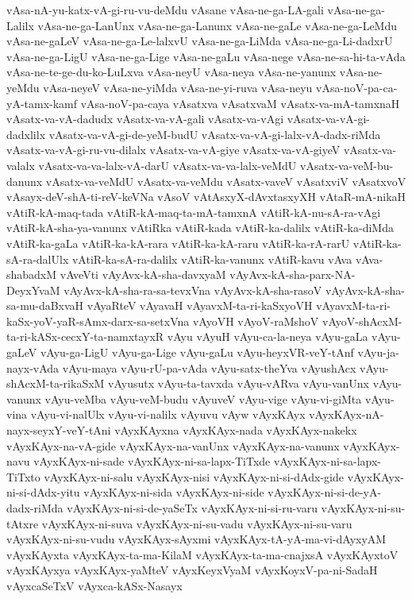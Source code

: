{vAsa-nA-yu-katx-vA-gi-ru-vu-deMdu
vAsane
vAsa-ne-ga-LA-gali
vAsa-ne-ga-Lalilx
vAsa-ne-ga-LanUnx
vAsa-ne-ga-Lanunx
vAsa-ne-gaLe
vAsa-ne-ga-LeMdu
vAsa-ne-gaLeV
vAsa-ne-ga-Le-lalxvU
vAsa-ne-ga-LiMda
vAsa-ne-ga-Li-dadxrU
vAsa-ne-ga-LigU
vAsa-ne-ga-Lige
vAsa-ne-gaLu
vAsa-nege
vAsa-ne-sa-hi-ta-vAda
vAsa-ne-te-ge-du-ko-LuLxva
vAsa-neyU
vAsa-neya
vAsa-ne-yanunx
vAsa-ne-yeMdu
vAsa-neyeV
vAsa-ne-yiMda
vAsa-ne-yi-ruva
vAsa-neyu
vAsa-noV-pa-ca-yA-tamx-kamf
vAsa-noV-pa-caya
vAsatxva
vAsatxvaM
vAsatx-va-mA-tamxnaH
vAsatx-va-vA-dadudx
vAsatx-va-vA-gali
vAsatx-va-vAgi
vAsatx-va-vA-gi-dadxlilx
vAsatx-va-vA-gi-de-yeM-budU
vAsatx-va-vA-gi-lalx-vA-dadx-riMda
vAsatx-va-vA-gi-ru-vu-dilalx
vAsatx-va-vA-giye
vAsatx-va-vA-giyeV
vAsatx-va-valalx
vAsatx-va-va-lalx-vA-darU
vAsatx-va-va-lalx-veMdU
vAsatx-va-veM-bu-danunx
vAsatx-va-veMdU
vAsatx-va-veMdu
vAsatx-vaveV
vAsatxviV
vAsatxvoV
vAsayx-deV-shA-ti-reV-keVNa
vAsoV
vAtAsxyX-dAvxtasxyXH
vAtaR-mA-nikaH
vAtiR-kA-maq-tada
vAtiR-kA-maq-ta-mA-tamxnA
vAtiR-kA-nu-sA-ra-vAgi
vAtiR-kA-sha-ya-vanunx
vAtiRka
vAtiR-kada
vAtiR-ka-dalilx
vAtiR-ka-diMda
vAtiR-ka-gaLa
vAtiR-ka-kA-rara
vAtiR-ka-kA-raru
vAtiR-ka-rA-rarU
vAtiR-ka-sA-ra-dalUlx
vAtiR-ka-sA-ra-dalilx
vAtiR-ka-vanunx
vAtiR-kavu
vAva
vAva-shabadxM
vAveVti
vAyAvx-kA-sha-davxyaM
vAyAvx-kA-sha-parx-NA-DeyxYvaM
vAyAvx-kA-sha-ra-sa-tevxVna
vAyAvx-kA-sha-rasoV
vAyAvx-kA-sha-sa-mu-daBxvaH
vAyaRteV
vAyavaH
vAyavxM-ta-ri-kaSxyoVH
vAyavxM-ta-ri-kaSx-yoV-yaR-sAmx-darx-sa-setxVna
vAyoVH
vAyoV-raMshoV
vAyoV-shAcxM-ta-ri-kASx-cecxY-ta-namxtayxR
vAyu
vAyuH
vAyu-ca-la-neya
vAyu-gaLa
vAyu-gaLeV
vAyu-ga-LigU
vAyu-ga-Lige
vAyu-gaLu
vAyu-heyxVR-veY-tAnf
vAyu-ja-nayx-vAda
vAyu-maya
vAyu-rU-pa-vAda
vAyu-satx-theYva
vAyushAcx
vAyu-shAcxM-ta-rikaSxM
vAyusutx
vAyu-ta-tavxda
vAyu-vARva
vAyu-vanUnx
vAyu-vanunx
vAyu-veMba
vAyu-veM-budu
vAyuveV
vAyu-vige
vAyu-vi-giMta
vAyu-vina
vAyu-vi-nalUlx
vAyu-vi-nalilx
vAyuvu
vAyw
vAyxKAyx
vAyxKAyx-nA-nayx-seyxY-veY-tAni
vAyxKAyxna
vAyxKAyx-nada
vAyxKAyx-nakekx
vAyxKAyx-na-vA-gide
vAyxKAyx-na-vanUnx
vAyxKAyx-na-vanunx
vAyxKAyx-navu
vAyxKAyx-ni-sade
vAyxKAyx-ni-sa-lapx-TiTxde
vAyxKAyx-ni-sa-lapx-TiTxto
vAyxKAyx-ni-salu
vAyxKAyx-nisi
vAyxKAyx-ni-si-dAdx-gide
vAyxKAyx-ni-si-dAdx-yitu
vAyxKAyx-ni-sida
vAyxKAyx-ni-side
vAyxKAyx-ni-si-de-yA-dadx-riMda
vAyxKAyx-ni-si-de-yaSeTx
vAyxKAyx-ni-si-ru-varu
vAyxKAyx-ni-su-tAtxre
vAyxKAyx-ni-suva
vAyxKAyx-ni-su-vadu
vAyxKAyx-ni-su-varu
vAyxKAyx-ni-su-vudu
vAyxKAyx-sAyxmi
vAyxKAyx-tA-yA-ma-vi-dAyxyAM
vAyxKAyxta
vAyxKAyx-ta-ma-KilaM
vAyxKAyx-ta-ma-cnajxsA
vAyxKAyxtoV
vAyxKAyxya
vAyxKAyx-yaMteV
vAyxKeyxVyaM
vAyxKoyxV-pa-ni-SadaH
vAyxcaSeTxV
vAyxca-kASx-Nasayx
}
